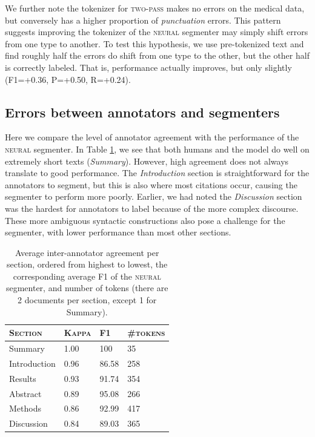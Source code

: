 We further note the tokenizer for \textsc{two-pass} makes no errors on the medical data, but conversely has a higher proportion of \textit{punctuation} errors. This pattern suggests improving the tokenizer of the \textsc{neural} segmenter may simply shift errors from one type to another. To test this hypothesis, we use pre-tokenized text and find roughly half the errors do shift from one type to the other, but the other half is correctly labeled. That is, performance actually improves, but only slightly (F1=+0.36, P=+0.50, R=+0.24).


\subsection{Errors between annotators and segmenters}
Here we compare the level of annotator agreement with the performance of the \textsc{neural} segmenter. In Table \ref{tab:anno_f1}, we see that both humans and the model do well on extremely short texts (\textit{Summary}). However, high agreement does not always translate to good performance. The \textit{Introduction} section is straightforward for the annotators to segment, but this is also where most citations occur, causing the segmenter to perform more poorly. Earlier, we had noted the \textit{Discussion} section was the hardest for annotators to label because of the more complex discourse. These more ambiguous syntactic constructions also pose a challenge for the segmenter, with lower performance than most other sections. 

\begin{table}[]
    \centering
    \begin{tabular}{llll}
    \toprule
         \textsc{Section}&  \textsc{Kappa} & \textsc{F1} & \textsc{\#tokens}\\
         \midrule
         Summary & 1.00 &100 & 35 \\
         Introduction & 0.96 &86.58 & 258 \\
         Results & 0.93 & 91.74 & 354 \\
         Abstract & 0.89 & 95.08 & 266 \\
         Methods & 0.86 & 92.99 & 417 \\
         Discussion & 0.84 & 89.03 & 365 \\
         \bottomrule
    \end{tabular}
    \vspace{-0.6em}
    \caption{Average inter-annotator agreement per section, ordered from highest to lowest, the corresponding average F1 of the \textsc{neural} segmenter, and number of tokens (there are 2 documents per section, except 1 for Summary).}
    \label{tab:anno_f1}
\end{table}

